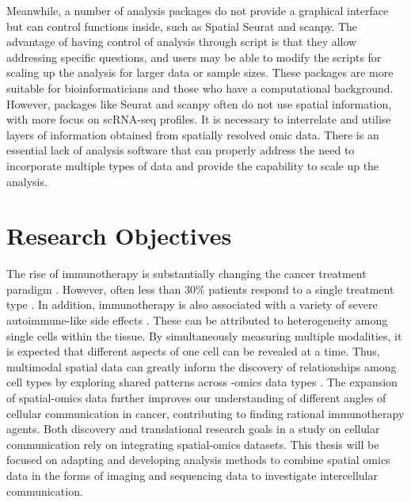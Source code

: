 Meanwhile, a number of analysis packages do not provide a graphical interface but can control functions inside, such as Spatial Seurat and scanpy. The advantage of having control of analysis through script is that they allow addressing specific questions, and users may be able to modify the scripts for scaling up the analysis for larger data or sample sizes. These packages are more suitable for bioinformaticians and those who have a computational background. However, packages like Seurat and scanpy often do not use spatial information, with more focus on scRNA-seq profiles. It is necessary to interrelate and utilise layers of information obtained from spatially resolved omic data. There is an essential lack of analysis software that can properly address the need to incorporate multiple types of data and provide the capability to scale up the analysis.


\label{subsec:ST_seq}

\section{Research Objectives}
The rise of immunotherapy is substantially changing the cancer treatment paradigm \cite{dobosz2019intriguing}. However, often less than $30\%$ patients respond to a single treatment type \cite{ott2017combination}. In addition, immunotherapy is also associated with a variety of severe autoimmune-like side effects \cite{naidoo2015toxicities,bertrand2015immune}. These can be attributed to heterogeneity among single cells within the tissue. By simultaneously measuring multiple modalities, it is expected that different aspects of one cell can be revealed at a time. Thus, multimodal spatial data can greatly inform the discovery of relationships among cell types by exploring shared patterns across -omics data types \cite{teichmann2020method}. The expansion of spatial-omics data further improves our understanding of different angles of cellular communication in cancer, contributing to finding rational immunotherapy agents. Both discovery and translational research goals in a study on cellular communication rely on integrating spatial-omics datasets. This thesis will be focused on adapting and developing analysis methods to combine spatial omics data in the forms of imaging and sequencing data to investigate intercellular communication.   


